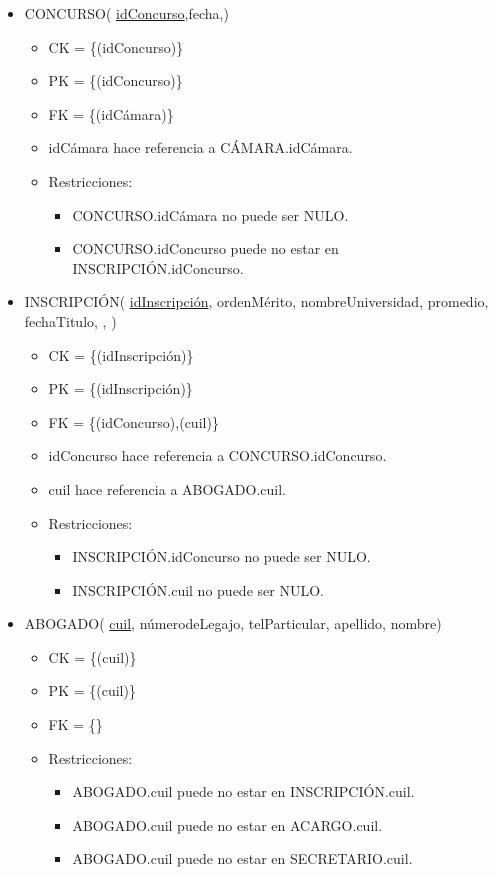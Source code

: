 \begin{itemize}
	
\item CONCURSO( \underline{idConcurso},fecha,)
	\begin{itemize}
		\item CK = \{(idConcurso)\}
		\item PK = \{(idConcurso)\}
		\item FK = \{(idCámara)\}
		\item idCámara hace referencia a CÁMARA.idCámara.
		\item Restricciones:
			\begin{itemize}
			\item CONCURSO.idCámara no puede ser NULO.
			\item CONCURSO.idConcurso puede no estar en INSCRIPCIÓN.idConcurso.
			\\			
			\end{itemize}		
	\end{itemize}
	
	
\item INSCRIPCIÓN( \underline{idInscripción}, ordenMérito, nombreUniversidad, promedio, fechaTitulo, , )
	\begin{itemize}
		\item CK = \{(idInscripción)\}
		\item PK = \{(idInscripción)\}
		\item FK = \{(idConcurso),(cuil)\}
		\item idConcurso hace referencia a CONCURSO.idConcurso.
		\item cuil hace referencia a ABOGADO.cuil.
		\item Restricciones:
			\begin{itemize}
			\item INSCRIPCIÓN.idConcurso no puede ser NULO.
			\item INSCRIPCIÓN.cuil no puede ser NULO.
			\\
			\end{itemize}
	\end{itemize}
	
	
\item ABOGADO( \underline{cuil}, númerodeLegajo, telParticular, apellido, nombre)
	\begin{itemize}
		\item CK = \{(cuil)\}
		\item PK = \{(cuil)\}
		\item FK = \{\}
		\item Restricciones:
			\begin{itemize}
			\item ABOGADO.cuil puede no estar en INSCRIPCIÓN.cuil.
			\item ABOGADO.cuil puede no estar en ACARGO.cuil.
			\item ABOGADO.cuil puede no estar en SECRETARIO.cuil.
			\\
			\end{itemize}
	\end{itemize}


\end{itemize}
